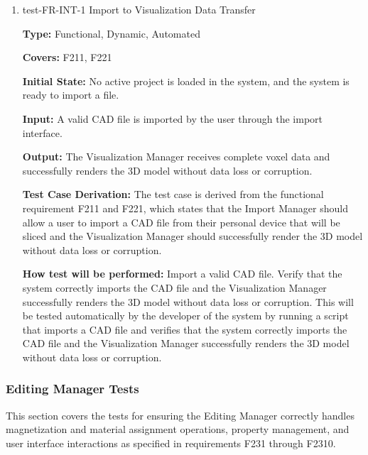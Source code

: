 \documentclass[12pt, titlepage]{article}
\begin{document}
\begin{enumerate}

\item{test-FR-INT-1 Import to Visualization Data Transfer\\}

\textbf{Type:} Functional, Dynamic, Automated

\textbf{Covers:} F211, F221
					
\textbf{Initial State:} No active project is loaded in the system, and the system is ready to import a file.
					
\textbf{Input:} A valid CAD file is imported by the user through the import interface.
					
\textbf{Output:} The Visualization Manager receives complete voxel data and successfully renders the 3D model without data loss or corruption.

\textbf{Test Case Derivation:} The test case is derived from the functional requirement F211 and F221, which states that the Import Manager should allow a user to import a CAD file from their personal device that will be sliced and the Visualization Manager should successfully render the 3D model without data loss or corruption.
					
\textbf{How test will be performed:} Import a valid CAD file. Verify that the system correctly imports the CAD file and the Visualization Manager successfully renders the 3D model without data loss or corruption. This will be tested automatically by the developer of the system by running a script that imports a CAD file and verifies that the system correctly imports the CAD file and the Visualization Manager successfully renders the 3D model without data loss or corruption.


\end{enumerate}

\subsubsection{Editing Manager Tests}
This section covers the tests for ensuring the Editing Manager correctly
handles magnetization and material assignment operations, property management,
and user interface interactions as specified in requirements F231 through F2310.
\end{document}

